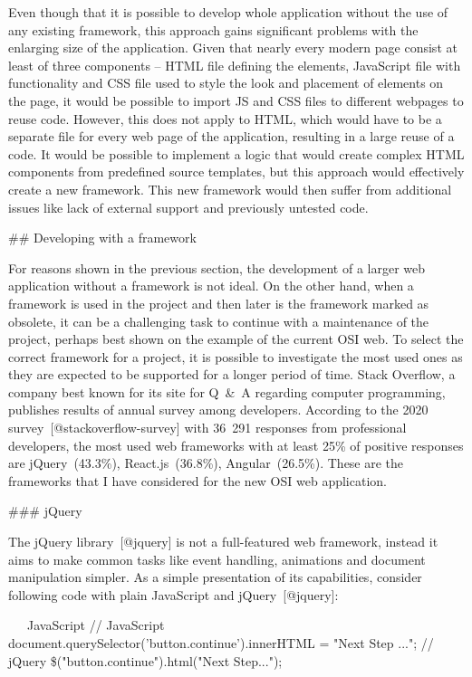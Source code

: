 \documentclass[
  digital, %
  oneside, %
  lof,     %
  lot,     %
]{fithesis4}
\begin{document}
{Even though that it is possible to develop whole application without the use of any existing framework, this approach gains significant problems with the enlarging size of the application. Given that nearly every modern page consist at least of three components -- HTML file defining the elements, JavaScript file with functionality and CSS file used to style the look and placement of elements on the page, it would be possible to import JS and CSS files to different webpages to reuse code. However, this does not apply to HTML, which would have to be a separate file for every web page of the application, resulting in a large reuse of a code. It would be possible to implement a logic that would create complex HTML components from predefined source templates, but this approach would effectively create a new framework. This new framework would then suffer from additional issues like lack of external support and previously untested code.

## Developing with a framework

For reasons shown in the previous section, the development of a larger web application without a framework is not ideal. On the other hand, when a framework is used in the project and then later is the framework marked as obsolete, it can be a challenging task to continue with a maintenance of the project, perhaps best shown on the example of the current OSI web. To select the correct framework for a project, it is possible to investigate the most used ones as they are expected to be supported for a longer period of time. Stack Overflow, a company best known for its site for Q~\&~A regarding computer programming, publishes results of annual survey among developers. According to the 2020 survey~[@stackoverflow-survey] with 36~291 responses from professional developers, the most used web frameworks with at least 25\% of positive responses are jQuery~(43.3\%), React.js~(36.8\%), Angular~(26.5\%). These are the frameworks that I have considered for the new OSI web application.

### jQuery

The jQuery library~[@jquery] is not a full-featured web framework, instead it aims to make common tasks like event handling, animations and document manipulation simpler. As a simple presentation of its capabilities, consider following code with plain JavaScript and jQuery~[@jquery]:

~~~JavaScript
// JavaScript
document.querySelector('button.continue').innerHTML = "Next Step ...";
// jQuery
\$("button.continue").html("Next Step...");
~~~

}
\end{document}

